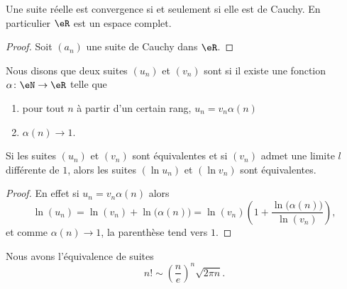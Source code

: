 \begin{theorem}  \label{ThoHGyzAva}
    Une suite réelle est convergence si et seulement si elle est de Cauchy. En particulier \( \eR\) est un espace complet.
\end{theorem}

\begin{proof}
    Soit \( (a_n)\) une suite de Cauchy dans \( \eR\).   
\end{proof}

\begin{definition}
    Nous disons que deux suites \( (u_n)\) et \( (v_n)\) sont  si il existe une fonction \( \alpha\colon \eN\to \eR\) telle que
    \begin{enumerate}
        \item
            pour tout \( n\) à partir d'un certain rang, \( u_n=v_n\alpha(n)\)
        \item
            \( \alpha(n)\to 1\).
    \end{enumerate}
\end{definition}

\begin{lemma}
    Si les suites \( (u_n)\) et \( (v_n)\) sont équivalentes et si \( (v_n)\) admet une limite \( l\) différente de \( 1\), alors les suites \( (\ln u_n)\) et \( (\ln v_n)\) sont équivalentes.
\end{lemma}

\begin{proof}
    En effet si \( u_n=v_n\alpha(n)\) alors
    \begin{equation}
        \ln(u_n)=\ln(v_n)+\ln\big( \alpha(n) \big)=\ln(v_n)\left( 1+\frac{ \ln\big( \alpha(n) \big) }{ \ln(v_n) } \right),
    \end{equation}
    et comme \( \alpha(n)\to 1\), la parenthèse tend vers \( 1\).
\end{proof}

\begin{lemma}        \label{LemCEoBqrP}
    Nous avons l'équivalence de suites
    \begin{equation}
        n!\sim \left( \frac{ n }{ e } \right)^n\sqrt{2\pi n}.
    \end{equation}
\end{lemma}


